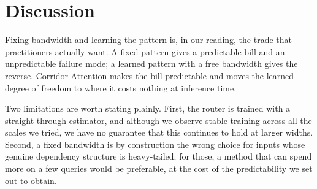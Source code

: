 \section{Discussion}\label{sec:discussion}

Fixing bandwidth and learning the pattern is, in our reading, the trade that
practitioners actually want. A fixed pattern gives a predictable bill and an
unpredictable failure mode; a learned pattern with a free bandwidth gives the
reverse. Corridor Attention makes the bill predictable and moves the learned
degree of freedom to where it costs nothing at inference time.

Two limitations are worth stating plainly. First, the router is trained with a
straight-through estimator, and although we observe stable training across all
the scales we tried, we have no guarantee that this continues to hold at
larger widths. Second, a fixed bandwidth is by construction the wrong choice
for inputs whose genuine dependency structure is heavy-tailed; for those, a
method that can spend more on a few queries would be preferable, at the cost of
the predictability we set out to obtain.

